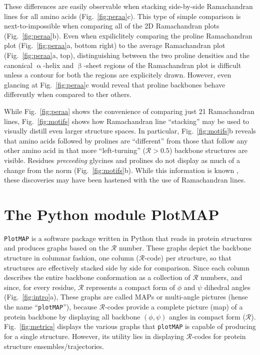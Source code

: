 \documentclass[fleqn,10pt]{wlpeerj} %
\newcommand{\Fig}[1]{Fig.~\ref{#1}}
\newcommand{\pname}{\texttt{plotMAP}\xspace}
\newcommand{\code}[1]{\texttt{#1}\xspace}
\newcommand{\rr}{$\mathcal{R}$\xspace}
\begin{document}
These differences are easily observable when stacking side-by-side Ramachandran lines for all amino acids (\Fig{fig:peraa}c). This type of simple comparison is next-to-impossible when comparing all of the 2D Ramachandran plots (\Fig{fig:peraa}b). Even when expiliclitely comparing the proline Ramachandran plot (\Fig{fig:peraa}a, bottom right) to the average Ramachandran plot (\Fig{fig:peraa}a, top), distinguishing between the two proline densities and the canonical $\upalpha$-helix and $\upbeta$-sheet regions of the Ramachandran plot is difficult unless a contour for both the regions are explicitely drawn. However, even glancing at \Fig{fig:peraa}c would reveal that proline backbones behave differently when compared to ther others.

While \Fig{fig:peraa} shows the convenience of comparing just 21 Ramachandran lines, \Fig{fig:motifs} shows how Ramachandran line ``stacking'' may be used to visually distill even larger structure spaces. In particular, \Fig{fig:motifs}b reveals that amino acids followed by prolines are ``different'' from those that follow any other amino acid in that more ``left-turning'' ($\mathcal{R} > 0.5$) backbone structures are visible. Residues \textit{preceeding} glycines and prolines do not display as much of a change from the norm (\Fig{fig:motifs}b). While this information is known \citep{Gunasekaran1998,Ho2005}, these discoveries may have been hastened with the use of Ramachandran lines.

\section*{The Python module PlotMAP}

\code{PlotMAP} is a software package written in Python that reads in protein structures and produces graphs based on the \rr number. These graphs depict the backbone structure in columnar fashion, one column ($\mathcal{R}$-code) per structure, so that structures are effectively stacked side by side for comparison. Since each column describes the entire backbone conformation as a collection of \rr numbers, and since, for every residue, \rr represents a compact form of $\phi$ and $\psi$ dihedral angles (\Fig{fig:intro}a), These graphs are called MAPs or multi-angle pictures (hense the name ``\pname''), because $\mathcal{R}$-codes provide a complete picture (map) of a protein backbone by displaying all backbone $(\phi,\psi)$ angles in compact form ($\mathcal{R}$). \Fig{fig:metrics} displays the various graphs that \pname is capable of producing for a single structure. However, its utility lies in displaying $\mathcal{R}$-codes for protein structure ensembles/trajectories.
\end{document}
